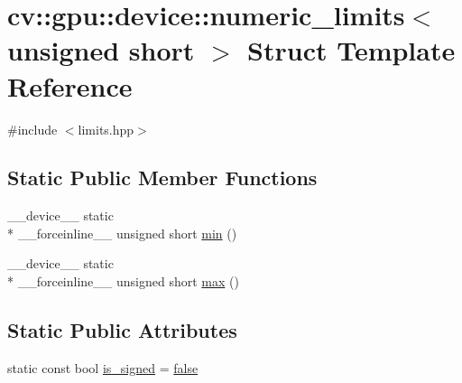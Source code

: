 \hypertarget{structcv_1_1gpu_1_1device_1_1numeric__limits_3_01unsigned_01short_01_4}{\section{cv\-:\-:gpu\-:\-:device\-:\-:numeric\-\_\-limits$<$ unsigned short $>$ Struct Template Reference}
\label{structcv_1_1gpu_1_1device_1_1numeric__limits_3_01unsigned_01short_01_4}
}


{\ttfamily \#include $<$limits.\-hpp$>$}

\subsection*{Static Public Member Functions}
\begin{DoxyCompactItemize}
\item 
\-\_\-\-\_\-device\-\_\-\-\_\- static \\*
\-\_\-\-\_\-forceinline\-\_\-\-\_\- unsigned short \hyperlink{structcv_1_1gpu_1_1device_1_1numeric__limits_3_01unsigned_01short_01_4_a17b2a8b25c4c7b75a1494b035ffd6cda}{min} ()
\item 
\-\_\-\-\_\-device\-\_\-\-\_\- static \\*
\-\_\-\-\_\-forceinline\-\_\-\-\_\- unsigned short \hyperlink{structcv_1_1gpu_1_1device_1_1numeric__limits_3_01unsigned_01short_01_4_af4980141f383d8179f847a31321a65cd}{max} ()
\end{DoxyCompactItemize}
\subsection*{Static Public Attributes}
\begin{DoxyCompactItemize}
\item 
static const bool \hyperlink{structcv_1_1gpu_1_1device_1_1numeric__limits_3_01unsigned_01short_01_4_afca29d1fb561d6836d22658eb028587c}{is\-\_\-signed} = \hyperlink{namespacecv_1_1gpu_1_1device_af8d6418be1712e83b4f398e7e7273026}{false}
\end{DoxyCompactItemize}



